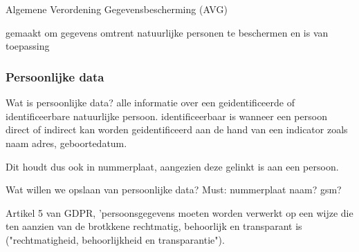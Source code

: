 
\chapter{}
\label{ch:richtlijnengdpr}

Algemene Verordening Gegevensbescherming (AVG)

gemaakt om gegevens omtrent natuurlijke personen te beschermen en is van toepassing 

\subsection{Persoonlijke data}
Wat is persoonlijke data?
alle informatie over een geidentificeerde of identificeerbare natuurlijke persoon.
identificeerbaar is wanneer een persoon direct of indirect kan worden geidentificeerd aan de hand van een indicator zoals naam adres, geboortedatum.

Dit houdt dus ook in nummerplaat, aangezien deze gelinkt is aan een persoon.


Wat willen we opslaan van persoonlijke data?
Must: nummerplaat
naam?
gsm?



Artikel 5 van GDPR, 'persoonsgegevens moeten worden verwerkt op een wijze die ten aanzien van de brotkkene rechtmatig, behoorlijk en transparant is ("rechtmatigheid, behoorlijkheid en transparantie").
